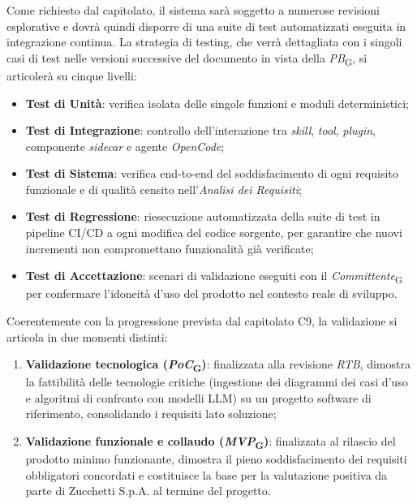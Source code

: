 \documentclass[11pt, a4paper]{article}
\newcommand{\glossario}[1]{\textit{#1}\textsubscript{G}}
\begin{document}
Come richiesto dal capitolato, il sistema sarà soggetto a numerose revisioni esplorative e dovrà quindi disporre di una suite di test automatizzati eseguita in integrazione continua. La strategia di testing, che verrà dettagliata con i singoli casi di test nelle versioni successive del documento in vista della \glossario{PB}, si articolerà su cinque livelli:
\begin{itemize}
    \item \textbf{Test di Unità}: verifica isolata delle singole funzioni e moduli deterministici;
    \item \textbf{Test di Integrazione}: controllo dell'interazione tra \textit{skill}, \textit{tool}, \textit{plugin}, componente \textit{sidecar} e agente \textit{OpenCode};
    \item \textbf{Test di Sistema}: verifica end-to-end del soddisfacimento di ogni requisito funzionale e di qualità censito nell'\textit{Analisi dei Requisiti};
    \item \textbf{Test di Regressione}: riesecuzione automatizzata della suite di test in pipeline CI/CD a ogni modifica del codice sorgente, per garantire che nuovi incrementi non compromettano funzionalità già verificate;
    \item \textbf{Test di Accettazione}: scenari di validazione eseguiti con il \glossario{Committente} per confermare l'idoneità d'uso del prodotto nel contesto reale di sviluppo.
\end{itemize}

Coerentemente con la progressione prevista dal capitolato C9, la validazione si articola in due momenti distinti:
\begin{enumerate}
    \item \textbf{Validazione tecnologica (\glossario{PoC})}: finalizzata alla revisione \textit{RTB}, dimostra la fattibilità delle tecnologie critiche (ingestione dei diagrammi dei casi d'uso e algoritmi di confronto con modelli LLM) su un progetto software di riferimento, consolidando i requisiti lato soluzione;
    \item \textbf{Validazione funzionale e collaudo (\glossario{MVP})}: finalizzata al rilascio del prodotto minimo funzionante, dimostra il pieno soddisfacimento dei requisiti obbligatori concordati e costituisce la base per la valutazione positiva da parte di Zucchetti S.p.A. al termine del progetto.
\end{enumerate}

\newpage

\end{document}
